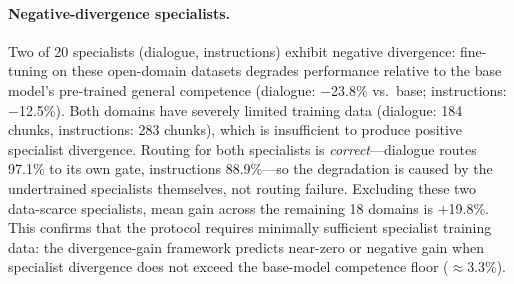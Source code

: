 \documentclass{article}
\begin{document}
\paragraph{Negative-divergence specialists.}
Two of 20 specialists (dialogue, instructions) exhibit negative divergence: fine-tuning on
these open-domain datasets degrades performance relative to the base model's pre-trained
general competence (dialogue: $-$23.8\% vs.\ base; instructions: $-$12.5\%).
Both domains have severely limited training data (dialogue: 184 chunks, instructions: 283
chunks), which is insufficient to produce positive specialist divergence.
Routing for both specialists is \emph{correct}---dialogue routes 97.1\% to its own gate,
instructions 88.9\%---so the degradation is caused by the undertrained specialists
themselves, not routing failure.
Excluding these two data-scarce specialists, mean gain across the remaining 18 domains is
$+$19.8\%. This confirms that the protocol requires minimally sufficient specialist
training data: the divergence-gain framework predicts near-zero or negative gain when
specialist divergence does not exceed the base-model competence floor ($\approx$3.3\%).
\end{document}
